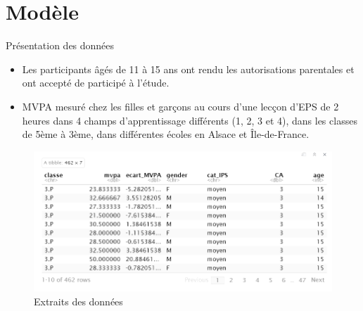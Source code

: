\documentclass{beamer}
\begin{document}
	\section{Modèle}
	\begin{frame}{Présentation des données}
		\begin{itemize}
			\item Les participants âgés de 11 à 15 ans ont rendu les autorisations parentales et ont accepté de participé à l'étude.
			\item MVPA mesuré chez les filles et garçons au cours d'une lecçon d'EPS de 2 heures dans 4 champs d'apprentissage différents (1, 2, 3 et 4), dans les classes de 5ème à 3ème, dans différentes écoles en Alsace et Île-de-France.
		\end{itemize}
		
		\begin{figure}[H]
			\centering
			\includegraphics[width=0.8\linewidth]{Extrai_donnée.PNG}
			\caption{Extraits des données}
			\label{fig:image1}
		\end{figure}
	\end{frame}
\end{document}
